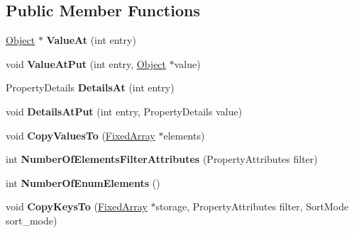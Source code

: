 \subsection*{Public Member Functions}
\begin{DoxyCompactItemize}
\item 
\hypertarget{classv8_1_1internal_1_1_dictionary_a51c4bded7e6db0ddf3a4e97edf2127d5}{}\hyperlink{classv8_1_1internal_1_1_object}{Object} $\ast$ {\bfseries Value\+At} (int entry)\label{classv8_1_1internal_1_1_dictionary_a51c4bded7e6db0ddf3a4e97edf2127d5}

\item 
\hypertarget{classv8_1_1internal_1_1_dictionary_abbcb17081750bfa03a130632306d6f51}{}void {\bfseries Value\+At\+Put} (int entry, \hyperlink{classv8_1_1internal_1_1_object}{Object} $\ast$value)\label{classv8_1_1internal_1_1_dictionary_abbcb17081750bfa03a130632306d6f51}

\item 
\hypertarget{classv8_1_1internal_1_1_dictionary_ab21eae90f16085474df143d165453d15}{}Property\+Details {\bfseries Details\+At} (int entry)\label{classv8_1_1internal_1_1_dictionary_ab21eae90f16085474df143d165453d15}

\item 
\hypertarget{classv8_1_1internal_1_1_dictionary_ac7ca3816f19a4ce1daeb3f5de1f3855b}{}void {\bfseries Details\+At\+Put} (int entry, Property\+Details value)\label{classv8_1_1internal_1_1_dictionary_ac7ca3816f19a4ce1daeb3f5de1f3855b}

\item 
\hypertarget{classv8_1_1internal_1_1_dictionary_aeb39c4273e0be7d10b8cfa017bd4c6f5}{}void {\bfseries Copy\+Values\+To} (\hyperlink{classv8_1_1internal_1_1_fixed_array}{Fixed\+Array} $\ast$elements)\label{classv8_1_1internal_1_1_dictionary_aeb39c4273e0be7d10b8cfa017bd4c6f5}

\item 
\hypertarget{classv8_1_1internal_1_1_dictionary_ae91f9bb36c882b6df4aa3e13da66f021}{}int {\bfseries Number\+Of\+Elements\+Filter\+Attributes} (Property\+Attributes filter)\label{classv8_1_1internal_1_1_dictionary_ae91f9bb36c882b6df4aa3e13da66f021}

\item 
\hypertarget{classv8_1_1internal_1_1_dictionary_a704fbe365b3bcd68e9e59c272a30fe23}{}int {\bfseries Number\+Of\+Enum\+Elements} ()\label{classv8_1_1internal_1_1_dictionary_a704fbe365b3bcd68e9e59c272a30fe23}

\item 
\hypertarget{classv8_1_1internal_1_1_dictionary_a3dc429406fad2f6bd553b5e415c35ada}{}void {\bfseries Copy\+Keys\+To} (\hyperlink{classv8_1_1internal_1_1_fixed_array}{Fixed\+Array} $\ast$storage, Property\+Attributes filter, Sort\+Mode sort\+\_\+mode)\label{classv8_1_1internal_1_1_dictionary_a3dc429406fad2f6bd553b5e415c35ada}


\end{DoxyCompactItemize}
